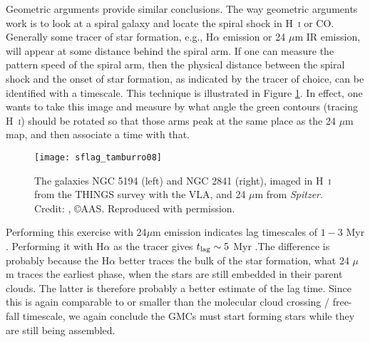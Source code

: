 Geometric arguments provide similar conclusions. The way geometric arguments work is to look at a spiral galaxy and locate the spiral shock in H~\textsc{i} or CO. Generally some tracer of star formation, e.g., H$\alpha$ emission or 24 $\mu$m IR emission, will appear at some distance behind the spiral arm. If one can measure the pattern speed of the spiral arm, then the physical distance between the spiral shock and the onset of star formation, as indicated by the tracer of choice, can be identified with a timescale. This technique is illustrated in Figure \ref{fig:sflag_tamburro08}. In effect, one wants to take this image and measure by what angle the green contours (tracing H~\textsc{i}) should be rotated so that those arms peak at the same place as the 24 $\mu$m map, and then associate a time with that.

\begin{figure}
\texttt{[image: sflag\_tamburro08]}
\caption[H~\textsc{i} and 24 $\mu$m maps of NGC 5194 and 2841]{
\label{fig:sflag_tamburro08}
The galaxies NGC 5194 (left) and NGC 2841 (right), imaged in H~\textsc{i} from the THINGS survey with the VLA, and 24 $\mu$m from \textit{Spitzer}. Credit: \citet{tamburro08a}, \copyright AAS. Reproduced with permission.
}
\end{figure}

Performing this exercise with 24$\mu$m emission indicates lag timescales of $1-3$ Myr \citet{tamburro08a}. Performing it with H$\alpha$ as the tracer gives $t_{\rm lag}\sim 5$ Myr \citet{egusa04a}.The difference is probably because the H$\alpha$ better traces the bulk of the star formation, what 24 $\mu$m traces the earliest phase, when the stars are still embedded in their parent clouds. The latter is therefore probably a better estimate of the lag time. Since this is again comparable to or smaller than the molecular cloud crossing / free-fall timescale, we again conclude the GMCs must start forming stars while they are still being assembled.

